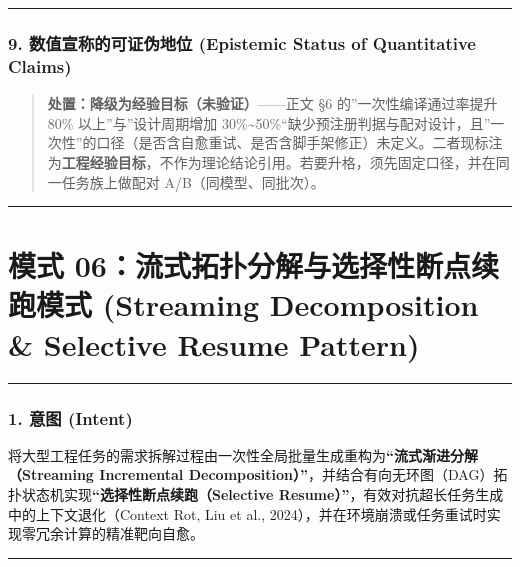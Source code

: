 \begin{center}\rule{0.5\linewidth}{0.5pt}\end{center}

\subsubsection{9. 数值宣称的可证伪地位 (Epistemic Status of Quantitative
Claims)}\label{ux6570ux503cux5ba3ux79f0ux7684ux53efux8bc1ux4f2aux5730ux4f4d-epistemic-status-of-quantitative-claims}

\begin{quote}
\textbf{处置：降级为经验目标（未验证）}------正文 §6
的''一次性编译通过率提升 80\% 以上''与''设计周期增加
30\%\textasciitilde50\%``缺少预注册判据与配对设计，且''一次性''的口径（是否含自愈重试、是否含脚手架修正）未定义。二者现标注为\textbf{工程经验目标}，不作为理论结论引用。若要升格，须先固定口径，并在同一任务族上做配对
A/B（同模型、同批次）。
\end{quote}

\begin{center}\rule{0.5\linewidth}{0.5pt}\end{center}

\section{模式 06：流式拓扑分解与选择性断点续跑模式 (Streaming
Decomposition \& Selective Resume
Pattern)}\label{ux6a21ux5f0f-06ux6d41ux5f0fux62d3ux6251ux5206ux89e3ux4e0eux9009ux62e9ux6027ux65adux70b9ux7eedux8dd1ux6a21ux5f0f-streaming-decomposition-selective-resume-pattern}

\begin{center}\rule{0.5\linewidth}{0.5pt}\end{center}

\subsubsection{1. 意图 (Intent)}\label{ux610fux56fe-intent-5}

将大型工程任务的需求拆解过程由一次性全局批量生成重构为\textbf{``流式渐进分解（Streaming
Incremental
Decomposition）''}，并结合有向无环图（DAG）拓扑状态机实现\textbf{``选择性断点续跑（Selective
Resume）''}，有效对抗超长任务生成中的上下文退化（Context Rot, Liu et
al., 2024），并在环境崩溃或任务重试时实现零冗余计算的精准靶向自愈。

\begin{center}\rule{0.5\linewidth}{0.5pt}\end{center}

